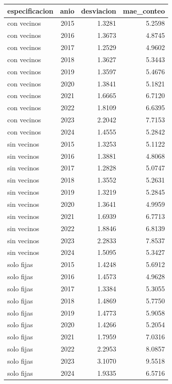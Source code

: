 \begin{tabular}{lrrr}
\toprule
especificacion & anio & desviacion & mae\_conteo \\
\midrule
con vecinos & 2015 & 1.3281 & 5.2598 \\
con vecinos & 2016 & 1.3673 & 4.8745 \\
con vecinos & 2017 & 1.2529 & 4.9602 \\
con vecinos & 2018 & 1.3627 & 5.3443 \\
con vecinos & 2019 & 1.3597 & 5.4676 \\
con vecinos & 2020 & 1.3841 & 5.1821 \\
con vecinos & 2021 & 1.6665 & 6.7120 \\
con vecinos & 2022 & 1.8109 & 6.6395 \\
con vecinos & 2023 & 2.2042 & 7.7153 \\
con vecinos & 2024 & 1.4555 & 5.2842 \\
sin vecinos & 2015 & 1.3253 & 5.1122 \\
sin vecinos & 2016 & 1.3881 & 4.8068 \\
sin vecinos & 2017 & 1.2828 & 5.0747 \\
sin vecinos & 2018 & 1.3552 & 5.2631 \\
sin vecinos & 2019 & 1.3219 & 5.2845 \\
sin vecinos & 2020 & 1.3641 & 4.9959 \\
sin vecinos & 2021 & 1.6939 & 6.7713 \\
sin vecinos & 2022 & 1.8846 & 6.8139 \\
sin vecinos & 2023 & 2.2833 & 7.8537 \\
sin vecinos & 2024 & 1.5095 & 5.3427 \\
solo fijas & 2015 & 1.4248 & 5.6912 \\
solo fijas & 2016 & 1.4573 & 4.9628 \\
solo fijas & 2017 & 1.3384 & 5.3055 \\
solo fijas & 2018 & 1.4869 & 5.7750 \\
solo fijas & 2019 & 1.4773 & 5.9058 \\
solo fijas & 2020 & 1.4266 & 5.2054 \\
solo fijas & 2021 & 1.7959 & 7.0316 \\
solo fijas & 2022 & 2.2953 & 8.0857 \\
solo fijas & 2023 & 3.1070 & 9.5518 \\
solo fijas & 2024 & 1.9335 & 6.5716 \\
\bottomrule
\end{tabular}

